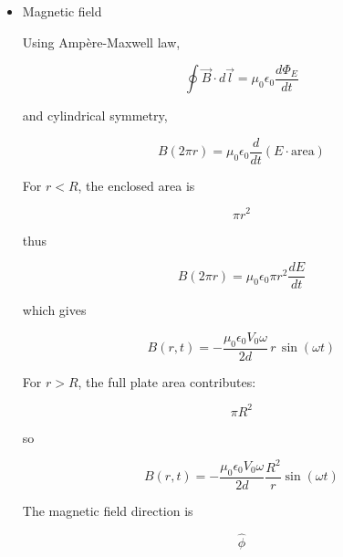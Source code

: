 \documentclass[12pt]{article}
\begin{document}
\begin{enumerate}
\begin{itemize}
\[
\boxed{
\vec J_d(t)
=
-
\epsilon_0
\frac{V_0\omega}{d}
\sin(\omega t)\,\hat z
}
\]

\item[(b)] Magnetic field

Using Ampère-Maxwell law,

\[
\oint \vec B\cdot d\vec l
=
\mu_0\epsilon_0
\frac{d\Phi_E}{dt}
\]

and cylindrical symmetry,

\[
B(2\pi r)
=
\mu_0\epsilon_0
\frac{d}{dt}
(E \cdot \text{area})
\]

For \(r<R\), the enclosed area is

\[
\pi r^2
\]

thus

\[
B(2\pi r)
=
\mu_0\epsilon_0
\pi r^2
\frac{dE}{dt}
\]

which gives

\[
\boxed{
B(r,t)
=
-
\frac{\mu_0\epsilon_0 V_0\omega}{2d}
\,r\,
\sin(\omega t)
}
\]

For \(r>R\), the full plate area contributes:

\[
\pi R^2
\]

so

\[
\boxed{
B(r,t)
=
-
\frac{\mu_0\epsilon_0 V_0\omega}{2d}
\frac{R^2}{r}
\sin(\omega t)
}
\]

The magnetic field direction is

\[
\boxed{\hat\phi}
\]
\end{itemize}

\end{enumerate}
\end{document}
